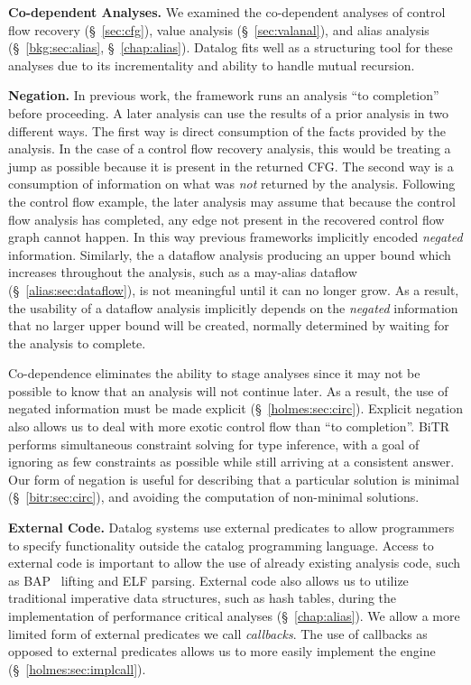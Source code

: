 \noindent\textbf{Co-dependent Analyses.}
We examined the co-dependent analyses of control flow recovery (\S~\ref{sec:cfg}), value analysis (\S~\ref{sec:valanal}), and alias analysis (\S~\ref{bkg:sec:alias}, \S~\ref{chap:alias}).
Datalog fits well as a structuring tool for these analyses due to its incrementality and ability to handle mutual recursion.

\noindent\textbf{Negation.}
In previous work, the framework runs an analysis ``to completion'' before proceeding.
A later analysis can use the results of a prior analysis in two different ways.
The first way is direct consumption of the facts provided by the analysis.
In the case of a control flow recovery analysis, this would be treating a jump as possible because it is present in the returned CFG.
The second way is a consumption of information on what was \emph{not} returned by the analysis.
Following the control flow example, the later analysis may assume that because the control flow analysis has completed, any edge not present in the recovered control flow graph cannot happen.
In this way previous frameworks implicitly encoded \emph{negated} information.
Similarly, the a dataflow analysis producing an upper bound which increases throughout the analysis, such as a may-alias dataflow (\S~\ref{alias:sec:dataflow}), is not meaningful until it can no longer grow.
As a result, the usability of a dataflow analysis implicitly depends on the \emph{negated} information that no larger upper bound will be created, normally determined by waiting for the analysis to complete. 

Co-dependence eliminates the ability to stage analyses since it may not be possible to know that an analysis will not continue later.
As a result, the use of negated information must be made explicit (\S~\ref{holmes:sec:circ}).
Explicit negation also allows us to deal with more exotic control flow than ``to completion''.
{\sc BiTR} performs simultaneous constraint solving for type inference, with a goal of ignoring as few constraints as possible while still arriving at a consistent answer.
Our form of negation is useful for describing that a particular solution is minimal (\S~\ref{bitr:sec:circ}), and avoiding the computation of non-minimal solutions.

\noindent\textbf{External Code.}
Datalog systems use external predicates to allow programmers to specify functionality outside the catalog programming language.
Access to external code is important to allow the use of already existing analysis code, such as BAP~\cite{bap} lifting and ELF parsing.
External code also allows us to utilize traditional imperative data structures, such as hash tables, during the implementation of performance critical analyses (\S~\ref{chap:alias}).
We allow a more limited form of external predicates we call \emph{callbacks}.
The use of callbacks as opposed to external predicates allows us to more easily implement the engine (\S~\ref{holmes:sec:implcall}).

